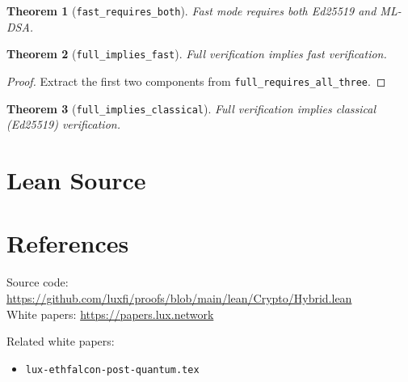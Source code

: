 \documentclass[11pt]{article}
\newtheorem{theorem}{Theorem}
\begin{document}
\begin{theorem}[\texttt{fast\_requires\_both}]
Fast mode requires both Ed25519 and ML-DSA.
\end{theorem}

\begin{theorem}[\texttt{full\_implies\_fast}]
Full verification implies fast verification.
\end{theorem}
\begin{proof}
Extract the first two components from \texttt{full\_requires\_all\_three}.
\end{proof}

\begin{theorem}[\texttt{full\_implies\_classical}]
Full verification implies classical (Ed25519) verification.
\end{theorem}


\section{Lean Source}


\section{References}
\noindent Source code: \url{https://github.com/luxfi/proofs/blob/main/lean/Crypto/Hybrid.lean}\\
\noindent White papers: \url{https://papers.lux.network}

\noindent Related white papers:
\begin{itemize}
  \item \texttt{lux-ethfalcon-post-quantum.tex}
\end{itemize}
\end{document}

